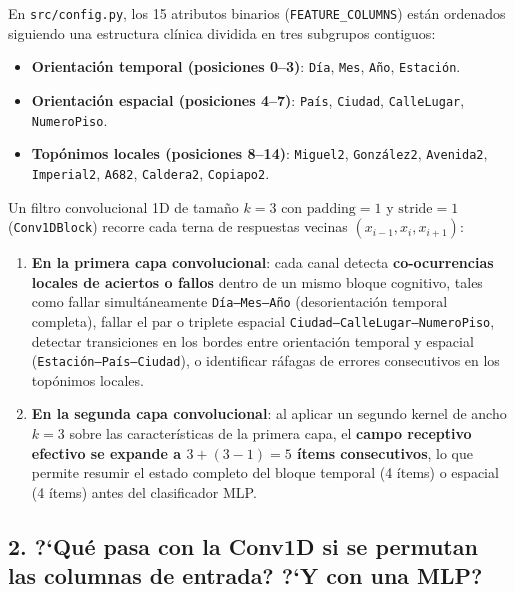 \documentclass[11pt,a4paper]{article}
\begin{document}
En \texttt{src/config.py}, los 15 atributos binarios (\texttt{FEATURE\_COLUMNS}) est\'an ordenados siguiendo una estructura cl\'inica dividida en tres subgrupos contiguos:
\begin{itemize}
    \item \textbf{Orientaci\'on temporal (posiciones 0--3)}: \texttt{D\'ia}, \texttt{Mes}, \texttt{A\~no}, \texttt{Estaci\'on}.
    \item \textbf{Orientaci\'on espacial (posiciones 4--7)}: \texttt{Pa\'is}, \texttt{Ciudad}, \texttt{CalleLugar}, \texttt{NumeroPiso}.
    \item \textbf{Top\'onimos locales (posiciones 8--14)}: \texttt{Miguel2}, \texttt{Gonz\'alez2}, \texttt{Avenida2}, \texttt{Imperial2}, \texttt{A682}, \texttt{Caldera2}, \texttt{Copiapo2}.
\end{itemize}

Un filtro convolucional 1D de tama\~no $k = 3$ con $\text{padding} = 1$ y $\text{stride} = 1$ (\texttt{Conv1DBlock}) recorre cada terna de respuestas vecinas $(x_{i-1}, x_i, x_{i+1})$:
\begin{enumerate}
    \item \textbf{En la primera capa convolucional}: cada canal detecta \textbf{co-ocurrencias locales de aciertos o fallos} dentro de un mismo bloque cognitivo, tales como fallar simult\'aneamente \texttt{D\'ia--Mes--A\~no} (desorientaci\'on temporal completa), fallar el par o triplete espacial \texttt{Ciudad--CalleLugar--NumeroPiso}, detectar transiciones en los bordes entre orientaci\'on temporal y espacial (\texttt{Estaci\'on--Pa\'is--Ciudad}), o identificar r\'afagas de errores consecutivos en los top\'onimos locales.
    \item \textbf{En la segunda capa convolucional}: al aplicar un segundo kernel de ancho $k = 3$ sobre las caracter\'isticas de la primera capa, el \textbf{campo receptivo efectivo se expande a $3 + (3 - 1) = 5$ \'items consecutivos}, lo que permite resumir el estado completo del bloque temporal (4 \'items) o espacial (4 \'items) antes del clasificador MLP.
\end{enumerate}

\subsection{2. ?`Qu\'e pasa con la Conv1D si se permutan las columnas de entrada? ?`Y con una MLP?}
\end{document}
